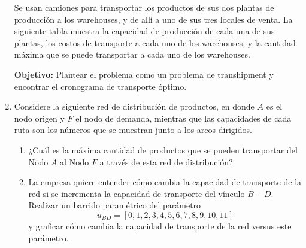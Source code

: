\documentclass{article}
\begin{document}
\begin{enumerate}
    Se usan camiones para transportar los productos de sus dos plantas de producción a los warehouses, y de allí a uno de sus tres locales de venta.  
    La siguiente tabla muestra la capacidad de producción de cada una de sus plantas, los costos de transporte a cada uno de los warehouses, y la cantidad máxima que se puede transportar a cada uno de los warehouses.

    \textbf{Objetivo:} Plantear el problema como un problema de transhipment y encontrar el cronograma de transporte óptimo.

    \begin{table}[h]
        \centering
    \end{table}

    \item Considere la siguiente red de distribución de productos, en donde \(A\) es el nodo origen y \(F\) el nodo de demanda, mientras que las capacidades de cada ruta son los números que se muestran junto a los arcos dirigidos.

    \begin{enumerate}
        \item ¿Cuál es la máxima cantidad de productos que se pueden transportar del Nodo \(A\) al Nodo \(F\) a través de esta red de distribución?
        \item La empresa quiere entender cómo cambia la capacidad de transporte de la red si se incrementa la capacidad de transporte del vínculo \(B-D\).  
        Realizar un barrido paramétrico del parámetro 
        \[
        u_{BD} = [0,1,2,3,4,5,6,7,8,9,10,11]
        \]
        y graficar cómo cambia la capacidad de transporte de la red versus este parámetro.
    \end{enumerate}


\end{enumerate}
\end{document}

